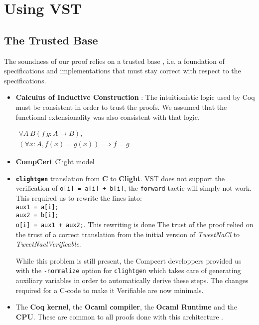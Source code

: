 \section{Using VST}

\subsection{The Trusted Base}

The soundness of our proof relies on a trusted base
, i.e. a foundation of specifications and implementations
that must stay correct with respect to the specifications.

\begin{itemize}
  \item \textbf{Calculus of Inductive Construction} : The intuitionistic logic
  used by Coq must be consistent in order to trust the proofs. We assumed that
  the functional extensionality was also consistent with that logic.

$
\begin{array}{c}
  \forall A\ B (f\ g : A \to B ),\\
  ( \forall x : A , f(x) = g(x) ) \implies f = g
\end{array}
$
  \item \textbf{CompCert} Clight model

  \item \textbf{\texttt{clightgen}} translation from \textbf{C} to
  \textbf{Clight}.
  VST does not support the verification of
  \texttt{o[i] = a[i] + b[i]}, the \texttt{forward} tactic will simply not work.
  This required us to rewrite the lines into:\\
  \texttt{aux1 = a[i];\\
  aux2 = b[i];\\
  o[i] = aux1 + aux2;}. This rewriting is done
  The trust of the proof relied on the trust of a correct translation from the
  initial version of \textit{TweetNaCl} to \textit{TweetNaclVerificable}.

  While this problem is still present, the Compcert developpers provided us with
  the \texttt{-normalize} option for \texttt{clightgen} which takes care of
  generating auxiliary variables in order to automatically derive these steps.
  The changes required for a C-code to make it Verifiable are now minimals.


  \item The \textbf{Coq kernel}, the \textbf{Ocaml compiler},
  the \textbf{Ocaml Runtime} and the \textbf{CPU}. These are common to all proofs
  done with this architecture \cite{2015-Appel,coq-faq}.
\end{itemize}

